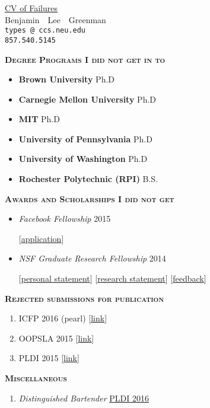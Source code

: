 \documentclass{article}
\makeatletter
\renewcommand{\maketitle}{
\begin{center}
  {\large{\href{https://www.princeton.edu/~joha/Johannes\_Haushofer\_CV\_of\_Failures.pdf}{CV of Failures}} \\
   \large{Benjamin~~Lee~~Greenman}}
\\\texttt{\fontseries{m}types\,@\,ccs.neu.edu}
\\\texttt{\fontseries{m}857.540.5145}
\end{center}
}
\newcommand{\mysection}[1]{\vspace{0.5cm}
\hspace{-1.3cm}\textsc{\textbf{#1}}~\hrulefill}
\makeatother
\begin{document}
\maketitle



\mysection{Degree Programs I did not get in to}

\begin{itemize}
\item {\bf Brown University} \hfill Ph.D
\item {\bf Carnegie Mellon University} \hfill Ph.D
\item {\bf MIT} \hfill Ph.D
\item {\bf University of Pennsylvania} \hfill Ph.D
\item {\bf University of Washington} \hfill Ph.D
\item {\bf Rochester Polytechnic (RPI)} \hfill B.S.
\end{itemize}




\mysection{Awards and Scholarships I did not get}
\begin{itemize}
\item \emph{Facebook Fellowship} \hfill 2015
\item[] [\href{http://ccs.neu.edu/home/types/cv/failures/facebook-2015-reject.pdf}{application}]
\item \emph{NSF Graduate Research Fellowship} \hfill 2014
\item[] [\href{http://ccs.neu.edu/home/types/cv/failures/nsf-2014-personal-reject.pdf}{personal statement}]
        [\href{http://ccs.neu.edu/home/types/cv/failures/nsf-2014-research-reject.pdf}{research statement}]
        [\href{http://ccs.neu.edu/home/types/cv/failures/nsf-2014-reject-response.pdf}{feedback}]
\end{itemize}


\mysection{Rejected submissions for publication}

\begin{enumerate}
\item ICFP 2016 (pearl) [\href{http://ccs.neu.edu/home/types/cv/failures/icfp-2016-reject.pdf}{link}]
\item OOPSLA 2015 [\href{http://ccs.neu.edu/home/types/cv/failures/oopsla-2015-reject.pdf}{link}]
\item PLDI 2015 [\href{http://ccs.neu.edu/home/types/cv/failures/pldi-2015-reject.pdf}{link}]
\end{enumerate}

\mysection{Miscellaneous}
\begin{enumerate}
\item \emph{Distinguished Bartender} \hfill \href{http://conf.researchr.org/home/PLDI-2016}{PLDI 2016}
\end{enumerate}
\end{document}
